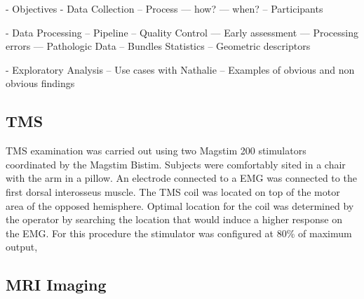 



 - Objectives
 - Data Collection
 -- Process
 --- how?
 --- when?
 -- Participants

 
 - Data Processing
 -- Pipeline
 -- Quality Control
 --- Early assessment
 --- Processing errors
 --- Pathologic Data
 -- Bundles Statistics
 -- Geometric descriptors

 - Exploratory Analysis
 -- Use cases with Nathalie
 -- Examples of obvious and non obvious findings

\subsection{TMS}
TMS examination was carried out using two Magstim 200 stimulators coordinated by the Magstim Bistim. Subjects were comfortably sited in a chair with the arm in a pillow. An electrode connected to a EMG was connected to the first dorsal interosseus muscle. The TMS coil was located on top of the motor area of the opposed hemisphere. Optimal location for the coil was determined by the operator by searching the location that would induce a higher response on the EMG. For this procedure the stimulator was configured at 80\% of maximum output, 


\subsection{MRI Imaging}



